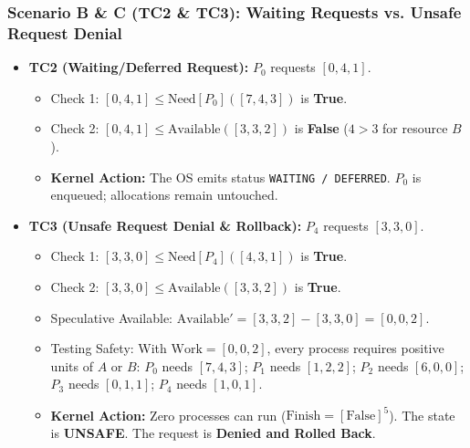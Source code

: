 \documentclass[11pt,a4paper]{article}
\begin{document}
\subsubsection{Scenario B \& C (TC2 \& TC3): Waiting Requests vs. Unsafe Request Denial}
\begin{itemize}[leftmargin=1.5em,noitemsep]
    \item \textbf{TC2 (Waiting/Deferred Request):} $P_0$ requests $[0, 4, 1]$.
    \begin{itemize}[noitemsep]
        \item Check 1: $[0, 4, 1] \le \text{Need}[P_0] ([7, 4, 3])$ is \textbf{True}.
        \item Check 2: $[0, 4, 1] \le \text{Available} ([3, 3, 2])$ is \textbf{False} ($4 > 3$ for resource $B$).
        \item \textbf{Kernel Action:} The OS emits status \texttt{WAITING / DEFERRED}. $P_0$ is enqueued; allocations remain untouched.
    \end{itemize}
    \item \textbf{TC3 (Unsafe Request Denial \& Rollback):} $P_4$ requests $[3, 3, 0]$.
    \begin{itemize}[noitemsep]
        \item Check 1: $[3, 3, 0] \le \text{Need}[P_4] ([4, 3, 1])$ is \textbf{True}.
        \item Check 2: $[3, 3, 0] \le \text{Available} ([3, 3, 2])$ is \textbf{True}.
        \item Speculative Available: $\text{Available}' = [3, 3, 2] - [3, 3, 0] = [0, 0, 2]$.
        \item Testing Safety: With $\text{Work} = [0, 0, 2]$, every process requires positive units of $A$ or $B$:
        $P_0$ needs $[7,4,3]$; $P_1$ needs $[1,2,2]$; $P_2$ needs $[6,0,0]$; $P_3$ needs $[0,1,1]$; $P_4$ needs $[1,0,1]$.
        \item \textbf{Kernel Action:} Zero processes can run ($\text{Finish} = [\text{False}]^5$). The state is \textbf{UNSAFE}. The request is \textbf{Denied and Rolled Back}.
    \end{itemize}
\end{itemize}
\end{document}
